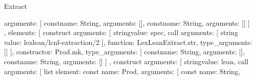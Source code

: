 \begin{lexlean}{Extract}
\begin{toolingmodule}
{{{{{{{{{{{{{{{{{{                                                      arguments: [
                                                        const{name: String, arguments: []},
                                                        const{name: String, arguments: []}
                                                      ]
                                                    },
                                                    elements: [
                                                      construct{
                                                        arguments: [
                                                          string{value: spec},
                                                          call{
                                                            arguments: [
                                                              string{
                                                                value: lexlean/lcnf-extraction/2
                                                              }
                                                            ],
                                                            function: LexLeanExtract.str,
                                                            type_arguments: []
                                                          }
                                                        ],
                                                        constructor: Prod.mk,
                                                        type_arguments: [
                                                          const{name: String, arguments: []},
                                                          const{name: String, arguments: []}
                                                        ]
                                                      },
                                                      construct{
                                                        arguments: [
                                                          string{value: lean},
                                                          call{
                                                            arguments: [
                                                              list{
                                                                element: const{
                                                                  name: Prod,
                                                                  arguments: [
                                                                    const{
                                                                      name: String,
}}}}}}}}}}}}}}}}}}}}}}
\end{toolingmodule}
\end{lexlean}
